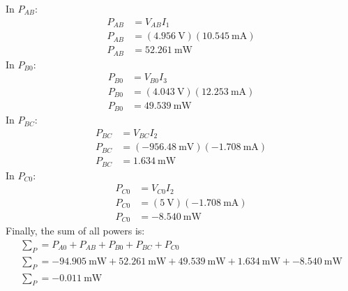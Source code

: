 \documentclass[a4paper]{article}
\begin{document}
In $P_{AB}$:
\begin{align*}
    P_{AB}&=V_{AB}I_1\\
    P_{AB}&=(\SI{4.956}{\volt})(\SI{10.545}{\milli\ampere})\\
    P_{AB}&=\SI{52.261}{\milli\watt}
\end{align*}
In $P_{B0}$:
\begin{align*}
    P_{B0}&=V_{B0}I_3\\
    P_{B0}&=(\SI{4.043}{\volt})(\SI{12.253}{\milli\ampere})\\
    P_{B0}&=\SI{49.539}{\milli\watt}
\end{align*}
In $P_{BC}$:
\begin{align*}
    P_{BC}&=V_{BC}I_2\\
    P_{BC}&=(\SI{-956.48}{\milli\volt})(\SI{-1.708}{\milli\ampere})\\
    P_{BC}&=\SI{1.634}{\milli\watt}
\end{align*}
In $P_{C0}$:
\begin{align*}
    P_{C0}&=V_{C0}I_2\\
    P_{C0}&=(\SI{5}{\volt})(\SI{-1.708}{\milli\ampere})\\
    P_{C0}&=\SI{-8.540}{\milli\watt}
\end{align*}
Finally, the sum of all powers is:
\begin{gather*}
    \sum\nolimits_{P}=P_{A0}+P_{AB}+P_{B0}+P_{BC}+P_{C0}\\
    \sum\nolimits_{P}=\SI{-94.905}{\milli\watt}+\SI{52.261}{\milli\watt}+\SI{49.539}{\milli\watt}+\SI{1.634}{\milli\watt}+\SI{-8.540}{\milli\watt}\\
    \sum\nolimits_{P}=\SI{-0.011}{\milli\watt}
\end{gather*}
\end{document}
